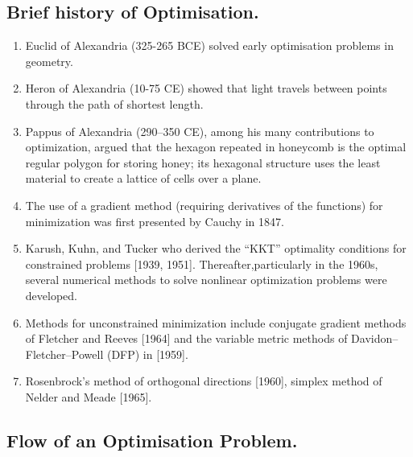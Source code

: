 \documentclass[12pt,a4paper,titlepage]{article}
\begin{document}
\subsection{Brief history of Optimisation.}
\begin{enumerate}
    \item Euclid of Alexandria (325-265 BCE) solved early optimisation problems in geometry. \cite{historyopt}
    \item Heron of Alexandria (10-75 CE) showed that light travels between points through the path of shortest length.
    \item Pappus of Alexandria (290–350 CE), among his many contributions to optimization, argued that the hexagon repeated in honeycomb is the optimal regular polygon for storing honey; its hexagonal structure uses the least material to create a lattice of cells over a plane.
    \item The use of a gradient method (requiring derivatives of the functions) for minimization was first presented by Cauchy in 1847. 
    \item Karush, Kuhn, and Tucker who derived the “KKT” optimality conditions for constrained problems [1939, 1951]. \cite{historyopt} Thereafter,particularly in the 1960s, several numerical methods to solve nonlinear optimization problems were developed.
    \item Methods for unconstrained minimization include conjugate gradient methods of Fletcher and Reeves [1964] and the variable metric methods of Davidon–Fletcher–Powell (DFP) in [1959]. \cite{chandrupatla}
    \item  Rosenbrock's method of orthogonal directions [1960], simplex method of Nelder and Meade [1965]. 
    \end{enumerate}
    
%
\subsection{Flow of an Optimisation Problem.}
\end{document}
